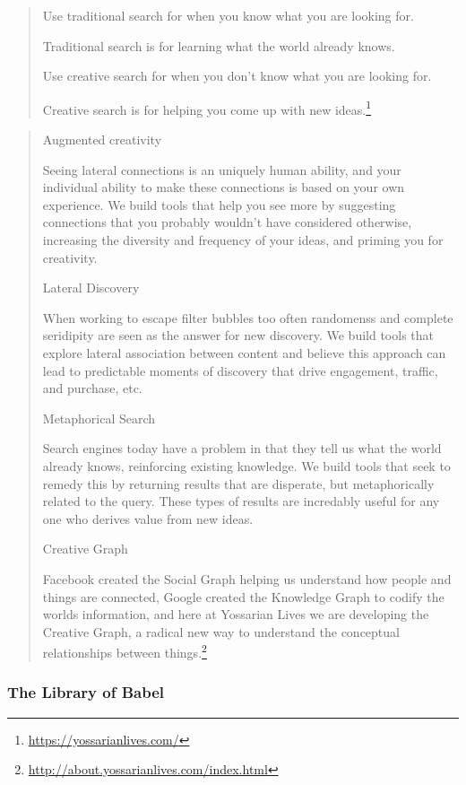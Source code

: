 \begin{quote}
  Use traditional search for when you know what you are looking for.

  Traditional search is for learning what the world already knows.

  Use creative search for when you don't know what you are looking for.

  Creative search is for helping you come up with new ideas.\footnote{\url{https://yossarianlives.com/}}
\end{quote}

\begin{quote}
  Augmented creativity

  Seeing lateral connections is an uniquely human ability, and your individual ability to make these connections is based on your own experience. We build tools that help you see more by suggesting connections that you probably wouldn't have considered otherwise, increasing the diversity and frequency of your ideas, and priming you for creativity.

  Lateral Discovery

  When working to escape filter bubbles too often randomenss and complete seridipity are seen as the answer for new discovery. We build tools that explore lateral association between content and believe this approach can lead to predictable moments of discovery that drive engagement, traffic, and purchase, etc.

  Metaphorical Search

  Search engines today have a problem in that they tell us what the world already knows, reinforcing existing knowledge. We build tools that seek to remedy this by returning results that are disperate, but metaphorically related to the query. These types of results are incredably useful for any one who derives value from new ideas.

  Creative Graph

  Facebook created the Social Graph helping us understand how people and things are connected, Google created the Knowledge Graph to codify the worlds information, and here at Yossarian Lives we are developing the Creative Graph, a radical new way to understand the conceptual relationships between things.\footnote{\url{http://about.yossarianlives.com/index.html}}
\end{quote}


\subsubsection*{The Library of Babel}

